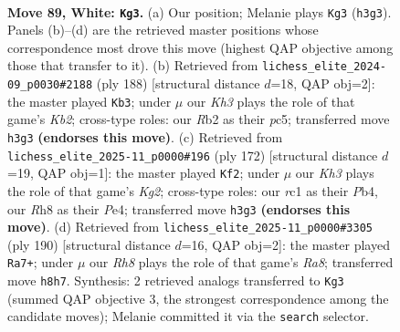 \documentclass[11pt]{article}
\begin{document}
\clearpage

\begin{figure}[p]\centering
\begin{subfigure}{0.46\textwidth}\centering
\resizebox{\linewidth}{!}{%
\newchessgame
\chessboard[
  setfen={7R/4k3/4pp2/8/P3P3/5P1K/1R6/2r5 w - - 4 89},
  showmover=false,
  pgfstyle=straightmove, color=movearrow, markmove={h3-g3}
]}
\caption{}
\end{subfigure}\hfill
\begin{subfigure}{0.46\textwidth}\centering
\resizebox{\linewidth}{!}{%
\newchessgame
\chessboard[
  setfen={8/P5R1/2k5/r1pp4/5p2/5P2/1K3P2/8 w - - 2 95},
  showmover=false,
  pgfstyle=straightmove, color=movearrow, markmove={b2-b3}
]}
\caption{}
\end{subfigure}
\\[4pt]
\begin{subfigure}{0.46\textwidth}\centering
\resizebox{\linewidth}{!}{%
\newchessgame
\chessboard[
  setfen={8/8/5k2/1p2p1p1/1P2P1P1/8/6K1/8 w - - 10 87},
  showmover=false,
  pgfstyle=straightmove, color=movearrow, markmove={g2-f2}
]}
\caption{}
\end{subfigure}\hfill
\begin{subfigure}{0.46\textwidth}\centering
\resizebox{\linewidth}{!}{%
\newchessgame
\chessboard[
  setfen={R7/5kp1/7p/7P/6P1/1r6/5K2/8 w - - 47 96},
  showmover=false,
  pgfstyle=straightmove, color=movearrow, markmove={a8-a7}
]}
\caption{}
\end{subfigure}
\caption{\textbf{Move 89, White: \texttt{Kg3}.} (a) Our position; Melanie plays \texttt{Kg3} (\texttt{h3g3}). Panels (b)--(d) are the retrieved master positions whose correspondence most drove this move (highest QAP objective among those that transfer to it). (b) Retrieved from \texttt{lichess\_elite\_2024-09\_p0030\#2188} (ply 188) [structural distance $d$=18, QAP obj=2]: the master played \texttt{Kb3}; under $\mu$ our \emph{Kh3} plays the role of that game's \emph{Kb2}; cross-type roles: our \emph{R}b2 as their \emph{p}c5; transferred move \texttt{h3g3} \textbf{(endorses this move)}. (c) Retrieved from \texttt{lichess\_elite\_2025-11\_p0000\#196} (ply 172) [structural distance $d$=19, QAP obj=1]: the master played \texttt{Kf2}; under $\mu$ our \emph{Kh3} plays the role of that game's \emph{Kg2}; cross-type roles: our \emph{r}c1 as their \emph{P}b4, our \emph{R}h8 as their \emph{P}e4; transferred move \texttt{h3g3} \textbf{(endorses this move)}. (d) Retrieved from \texttt{lichess\_elite\_2025-11\_p0000\#3305} (ply 190) [structural distance $d$=16, QAP obj=2]: the master played \texttt{Ra7+}; under $\mu$ our \emph{Rh8} plays the role of that game's \emph{Ra8}; transferred move \texttt{h8h7}. Synthesis: 2 retrieved analogs transferred to \texttt{Kg3} (summed QAP objective 3, the strongest correspondence among the candidate moves); Melanie committed it via the \texttt{search} selector.}
\label{fig:thought-m176}
\end{figure}
\end{document}
